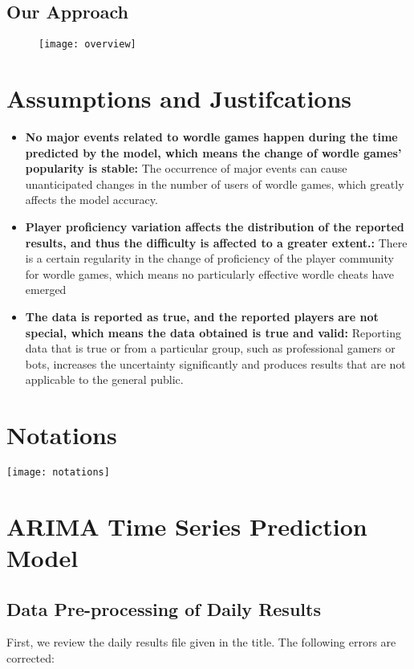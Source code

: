 \documentclass[12pt]{mcmthesis}
\begin{document}
\subsection{Our Approach}
\begin{figure}[h]
	\small
	\centering
	\texttt{[image: overview]}
\end{figure}
\section{Assumptions and Justifcations}
\begin{itemize}
\item \textbf{No major events related to wordle games happen during the time predicted by the model, which means the change of wordle games' popularity is stable:} The occurrence of major events can cause unanticipated changes in the number of users of wordle games, which greatly affects the model accuracy.
\item \textbf{Player proficiency variation affects the distribution of the reported results, and thus the difficulty is affected to a greater extent.:} There is a certain regularity in the change of proficiency of the player community for wordle games, which means no particularly effective wordle cheats have emerged
\item \textbf{The data is reported as true, and the reported players are not special, which means the data obtained is true and valid:} Reporting data that is true or from a particular group, such as professional gamers or bots, increases the uncertainty significantly and produces results that are not applicable to the general public. 
\end{itemize}
\section{Notations}
\begin{table}[!htbp]
	\small
	\centering
	\texttt{[image: notations]}
\end{table}
\newpage
\section{ARIMA Time Series Prediction Model}
\subsection{Data Pre-processing of Daily Results}
\hspace{1.4em}First, we review the daily results file given in the title. The following errors are corrected:
\end{document}
